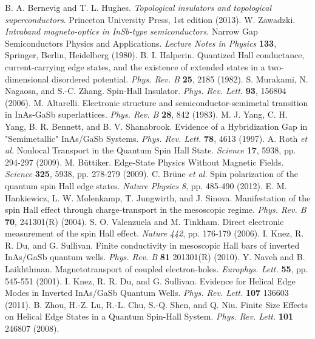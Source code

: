 \documentclass[titlepage,a4paper]{book}
\begin{document}
\begin{thebibliography}{199}
B. A. Bernevig and T. L. Hughes. \textit{Topological insulators and topological superconductors}. Princeton University Press, 1st edition (2013).
W. Zawadzki. \textit{Intraband magneto-optics in InSb-type semiconductors.} Narrow Gap Semiconductors Physics and Applications. \textit{Lecture Notes in Physics} \textbf{133}, Springer, Berlin, Heidelberg (1980).
B. I. Halperin. Quantized Hall conductance, current-carrying edge states, and the existence of extended states in a two-dimensional disordered potential. \textit{Phys. Rev. B} \textbf{25}, 2185 (1982).
S. Murakami, N. Nagaosa, and S.-C. Zhang. Spin-Hall Insulator. \textit{Phys. Rev. Lett.} \textbf{93}, 156804 (2006).
M. Altarelli. Electronic structure and semiconductor-semimetal transition in InAs-GaSb superlattices. \textit{Phys. Rev. B} \textbf{28}, 842 (1983).
M. J. Yang, C. H. Yang, B. R. Bennett, and B. V. Shanabrook. Evidence of a Hybridization Gap in "Semimetallic" InAs/GaSb Systems. \textit{Phys. Rev. Lett.} \textbf{78}, 4613 (1997).
A. Roth  \textit{et al.} Nonlocal Transport in the Quantum Spin Hall State. \textit{Science} \textbf{17}, 5938, pp. 294-297 (2009).
M. Büttiker. Edge-State Physics Without Magnetic Fields. \textit{Science} \textbf{325}, 5938, pp. 278-279 (2009).
C. Brüne \textit{et al.} Spin polarization of the quantum spin Hall edge states. \textit{Nature Physics} \textit{8}, pp. 485-490 (2012).
E. M. Hankiewicz, L. W. Molenkamp, T. Jungwirth, and J. Sinova. Manifestation of the spin Hall effect through charge-transport in the mesoscopic regime. \textit{Phys. Rev. B} \textbf{70}, 241301(R) (2004).  
S. O. Valenzuela and M. Tinkham. Direct electronic measurement of the spin Hall effect. \textit{Nature} \textit{442}, pp. 176-179 (2006).
I. Knez, R. R. Du, and G. Sullivan. Finite conductivity in mesoscopic Hall bars of inverted InAs/GaSb quantum wells. \textit{Phys. Rev. B} \textbf{81} 201301(R) (2010).
Y. Naveh and B. Laikhthman. Magnetotransport of coupled electron-holes. \textit{Europhys. Lett.} \textbf{55}, pp. 545-551 (2001).
I. Knez, R. R. Du, and G. Sullivan. Evidence for Helical Edge Modes in Inverted InAs/GaSb Quantum Wells. \textit{Phys. Rev. Lett.} \textbf{107} 136603 (2011).
B. Zhou, H.-Z. Lu, R.-L. Chu, S.-Q. Shen, and Q. Niu. Finite Size Effects on Helical Edge States in a Quantum Spin-Hall System. \textit{Phys. Rev. Lett.} \textbf{101} 246807 (2008).

\end{thebibliography}
\end{document}
